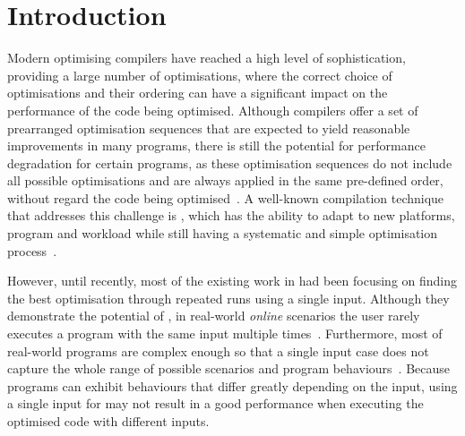 \vspace{-2em}
\section{Introduction}

Modern optimising compilers have reached a high level of sophistication,
providing a large number of optimisations, where the correct choice of
optimisations and their ordering can have a significant impact on the
performance of the code being optimised.
Although compilers offer a set of prearranged optimisation sequences that are
expected to yield reasonable improvements in many programs, there is still the
potential for performance degradation for certain programs, as these
optimisation sequences do not include all possible optimisations and are always
applied in the same pre-defined order, without regard the code being
optimised~\cite{pan06,cavazos07,zhou12,kulkarni12}.
A well-known compilation technique that addresses this challenge is {\itercomp},
which has the ability to adapt to new platforms, program and workload while
still having a systematic and simple optimisation process~\cite{kisuki99,fursin07,chen10}.


However, until recently, most of the existing work in {\itercomp} had been focusing on
finding the best optimisation through repeated runs using a single input.
Although they demonstrate the potential of {\itercomp}, in real-world
\textit{online} scenarios the user rarely executes a program with the same input
multiple times~\cite{bodin98,kisuki99,stephenson03,kulkarni04,agakov06}.
Furthermore, most of real-world programs are complex enough so that a single
input case does not capture the whole range of possible scenarios and program
behaviours~\cite{haneda06,fursin07,chen10,chen12a}.
Because programs can exhibit behaviours that differ greatly depending on the
input, using a single input for {\itercomp} may not result in a good performance
when executing the optimised code with different inputs.

